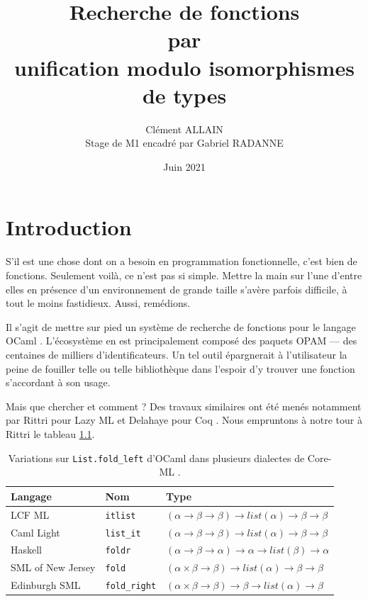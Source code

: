 \documentclass[a4paper]{report}
\title{Recherche de fonctions \\ par \\ unification modulo isomorphismes de types}
\author{Clément ALLAIN \\ Stage de M1 encadré par Gabriel RADANNE}
\date{Juin 2021}
\theoremstyle{definition}
\begin{document}
\maketitle

\tableofcontents

\newpage


\chapter{Introduction}

S'il est une chose dont on a besoin en programmation fonctionnelle, c'est bien de fonctions. Seulement voilà, ce n'est pas si simple. Mettre la main sur l'une d'entre elles en présence d'un environnement de grande taille s'avère parfois difficile, à tout le moins fastidieux. Aussi, remédions.

Il s'agit de mettre sur pied un système de recherche de fonctions pour le langage OCaml \cite{OCaml}. L'écosystème en est principalement composé des paquets OPAM --- des centaines de milliers d'identificateurs. Un tel outil épargnerait à l'utilisateur la peine de fouiller telle ou telle bibliothèque dans l'espoir d'y trouver une fonction s'accordant à son usage.

Mais que chercher et comment ? Des travaux similaires ont été menés notamment par Rittri pour Lazy ML \cite{Rittri91, Rittri93} et Delahaye pour Coq \cite{Delahaye}. Nous empruntons à notre tour à Rittri \cite{Rittri91} le tableau \ref{tab_fold}.

\begin{table}[h]
	\centering
	\begin{tabular}{|l|l|l|}
		\hline
			Langage &
			Nom &
			Type
		\\
		\hline
			LCF ML \cite{LCF_ML} &
			\texttt{itlist} &
			$(\alpha \rightarrow \beta \rightarrow \beta) \rightarrow list (\alpha) \rightarrow \beta \rightarrow \beta$
		\\
			Caml Light \cite{Caml_Light} &
			\texttt{list\_it} &
			$(\alpha \rightarrow \beta \rightarrow \beta) \rightarrow list (\alpha) \rightarrow \beta \rightarrow \beta$
		\\
			Haskell \cite{Haskell} &
			\texttt{foldr} &
			$(\alpha \rightarrow \beta \rightarrow \alpha) \rightarrow \alpha \rightarrow list (\beta) \rightarrow \alpha$
		\\
			SML of New Jersey \cite{SML_New_Jersey} &
			\texttt{fold} &
			$(\alpha \times \beta \rightarrow \beta) \rightarrow list (\alpha) \rightarrow \beta \rightarrow \beta$
		\\
			Edinburgh SML \cite{Edinburgh_SML} &
			\texttt{fold\_right} &
			$(\alpha \times \beta \rightarrow \beta) \rightarrow \beta \rightarrow list (\alpha) \rightarrow \beta$
		\\
		\hline
	\end{tabular}
	\caption{\label{tab_fold} Variations sur \texttt{List.fold\_left} d'OCaml dans plusieurs dialectes de Core-ML \cite{Core_ML}.}
\end{table}
\end{document}
